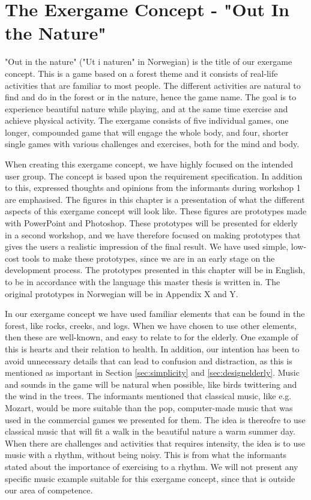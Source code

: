 \section{The Exergame Concept - "Out In the Nature"}
\label{sec:outinthenature}

"Out in the nature" ("Ut i naturen" in Norwegian) is the title of our exergame concept. This is a game based on a forest theme and it consists of real-life activities that are familiar to most people. The different activities are natural to find and do in the forest or in the nature, hence the game name. The goal is to experience beautiful nature while playing, and at the same time exercise and achieve physical activity. The exergame consists of five individual games, one longer, compounded game that will engage the whole body, and four, shorter single games with various challenges and exercises, both for the mind and body.    

When creating this exergame concept, we have highly focused on the intended user group. The concept is based upon the requirement specification. In addition to this, expressed thoughts and opinions from the informants during workshop 1 are emphasised. The figures in this chapter is a presentation of what the different aspects of this exergame concept will look like. These figures are prototypes made with PowerPoint and Photoshop. These prototypes will be presented for elderly in a second workshop, and we have therefore focused on making prototypes that gives the users a realistic impression of the final result. We have used simple, low-cost tools to make these prototypes, since we are in an early stage on the development process. The prototypes presented in this chapter will be in English, to be in accordance with the language this master thesis is written in. The original prototypes in Norwegian will be in Appendix X and Y.     

In our exergame concept we have used familiar elements that can be found in the forest, like rocks, creeks, and logs. When we have chosen to use other elements, then these are well-known, and easy to relate to for the elderly. One example of this is hearts and their relation to health. In addition, our intention has been to avoid unnecessary details that can lead to confusion and distraction, as this is mentioned as important in Section \ref{sec:simplicity} and \ref{sec:designelderly}. Music and sounds in the game will be natural when possible, like birds twittering and the wind in the trees. The informants mentioned that classical music, like e.g. Mozart, would be more suitable than the pop, computer-made music that was used in the commercial games we presented for them. The idea is thereofre to use classical music that will fit a walk in the beautiful nature a warm summer day. When there are challenges and activities that requires intensity, the idea is to use music with a rhythm, without being noisy. This is from what the informants stated about the importance of exercising to a rhythm. We will not present any specific music example suitable for this exergame concept, since that is outside our area of competence. 

